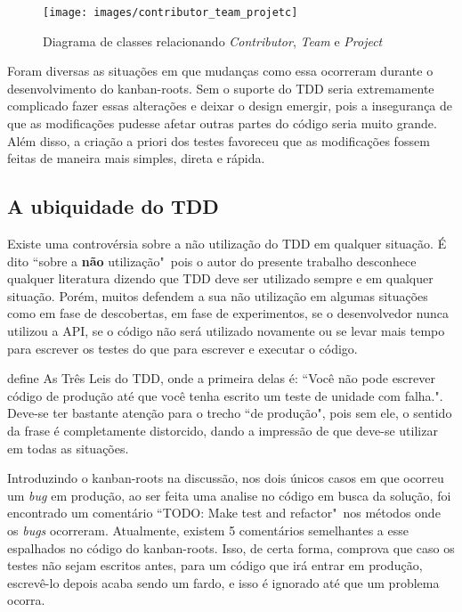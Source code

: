 \begin{figure}[h]
  \center
  \caption{Diagrama de classes relacionando \textit{Contributor}, \textit{Team} e \textit{Project}}
  \texttt{[image: images/contributor\_team\_projetc]}
  \label{img:contributor_team_projetc}
\end{figure}

Foram diversas as situações em que mudanças como essa ocorreram durante o desenvolvimento do kanban-roots. Sem o suporte do TDD seria extremamente complicado fazer essas alterações e deixar o design emergir, pois a insegurança de que as modificações pudesse afetar outras partes do código seria muito grande. Além disso, a criação a priori dos testes favoreceu que as modificações fossem feitas de maneira mais simples, direta e rápida.

\subsection{A ubiquidade do TDD}
\label{sub:a_ubiquidade_do_tdd}

Existe uma controvérsia sobre a não utilização do TDD em qualquer situação. É dito ``sobre a \textbf{não} utilização"\ pois o autor do presente trabalho desconhece qualquer literatura dizendo que TDD deve ser utilizado sempre e em qualquer situação. Porém, muitos defendem a sua não utilização em algumas situações como em fase de descobertas, em fase de experimentos, se o desenvolvedor nunca utilizou a API, se o código não será utilizado novamente ou se levar mais tempo para escrever os testes do que para escrever e executar o código.

 define As Três Leis do TDD, onde a primeira delas é: ``Você não pode escrever código de produção até que você tenha escrito um teste de unidade com falha.". Deve-se ter bastante atenção para o trecho ``de produção", pois sem ele, o sentido da frase é completamente distorcido, dando a impressão de que deve-se utilizar em todas as situações.

Introduzindo o kanban-roots na discussão, nos dois únicos casos em que ocorreu um \textit{bug} em produção, ao ser feita uma analise no código em busca da solução, foi encontrado um comentário ``TODO: Make test and refactor"\ nos métodos onde os \textit{bugs} ocorreram. Atualmente, existem 5 comentários semelhantes a esse espalhados no código do kanban-roots. Isso, de certa forma, comprova que caso os testes não sejam escritos antes, para um código que irá entrar em produção, escrevê-lo depois acaba sendo um fardo, e isso é ignorado até que um problema ocorra.

